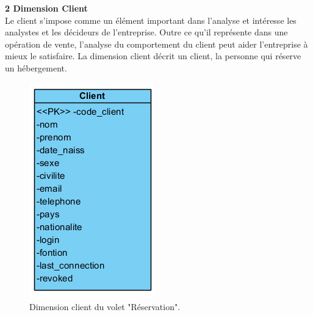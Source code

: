 \textbf{2 Dimension Client}\\
Le client s’impose comme un élément important dans l’analyse et intéresse les analystes et les décideurs de l’entreprise. Outre ce qu’il représente dans une opération de vente, l’analyse du comportement du client peut aider l’entreprise à mieux le satisfaire. La dimension client décrit un client, la personne qui réserve un hébergement.

\begin{figure}[!htbp]
	\begin{center}
		\includegraphics[scale=0.65]{images/dim_client.png}
		\caption{Dimension client du volet "Réservation".}
		\label{use_bi_tools}
	\end{center}
	\end{figure}

